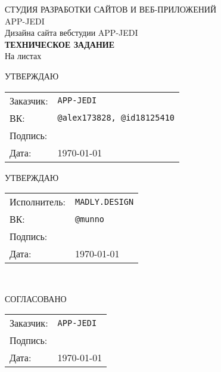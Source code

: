%
\begin{center}
{\Large {{СТУДИЯ РАЗРАБОТКИ САЙТОВ И ВЕБ-ПРИЛОЖЕНИЙ \\ {\LARGE APP-JEDI}}}}\\[4cm]

{\huge Дизайна сайта вебстудии {\LARGE APP-JEDI }} \\[0.5cm]
{ \Huge \bf ТЕХНИЧЕСКОЕ ЗАДАНИЕ}\\[0.5cm]
На \pageref{LastPage} листах\\[3.5cm]

\begin{minipage}{\textwidth}
  \begin{minipage}{0.5\textwidth}

    \begin{flushleft}
      \begin{center}
        {\large УТВЕРЖДАЮ}\\
      \end{center}
      \begin{tabular}{ll}
        Заказчик: & \texttt{APP-JEDI}\\
        ВК: & \texttt{@alex173828, @id18125410}\\
        Подпись: & \\
        Дата: & \today
      \end{tabular}
    \end{flushleft}
  \end{minipage}
  \begin{minipage}{0.5\textwidth}
    \begin{flushleft}
      \begin{center}
        {\large УТВЕРЖДАЮ}\\
      \end{center}
      \begin{tabular}{ll}
        Исполнитель: & \texttt{MADLY.DESIGN}\\
        ВК: & \texttt{@munno}\\
        Подпись: & \\
        Дата: & \today
      \end{tabular}
    \end{flushleft}
  \end{minipage}
\end{minipage}
\\[5cm]

\begin{flushleft}
\begin{minipage}{0.5\textwidth}
\begin{center}
  СОГЛАСОВАНО
\end{center}
\begin{tabular}{ll}
  Заказчик: & \texttt{APP-JEDI}\\
  Подпись: & \\
  Дата: & \today
\end{tabular}
\end{minipage}
\end{flushleft}
\end{center}
\thispagestyle{empty}
